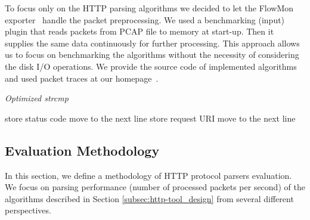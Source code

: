 To focus only on the HTTP parsing algorithms we decided to let the FlowMon exporter~\cite{FlowmonNetworks--Flowmon} handle the packet preprocessing. We used a  benchmarking (input) plugin that reads packets from PCAP file to memory at start-up. Then it supplies the same data continuously for further processing. This approach allows us to focus on benchmarking the algorithms without the necessity of considering the disk I/O operations. We provide the source code of implemented algorithms and used packet traces at our homepage~\cite{Sima-2013-FlowMon}.

\begin{algorithm}[tb]
\caption{\emph{Optimized strcmp}}
\label{alg:optimized-strcmp}
{\fontsize{8}{10}\selectfont
\begin{algorithmic}[1]
        \STATE store status code
                \ENDIF
            \ENDFOR
            \STATE move to the next line
        \ENDWHILE
    \ENDIF
        \STATE store request URI
                \ENDIF
            \ENDFOR
            \STATE move to the next line
        \ENDWHILE
    \ENDIF
\end{algorithmic}
}
\end{algorithm}

\subsection{Evaluation Methodology} \label{subsec:http-metodology}

In this section, we define a methodology of HTTP protocol parsers evaluation. We focus on parsing performance (number of processed packets per second) of the algorithms described in Section \ref{subsec:http-tool_design} from several different perspectives.

